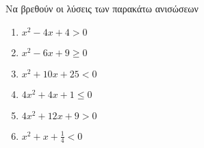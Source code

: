 Να βρεθούν οι λύσεις των παρακάτω ανισώσεων
\begin{multicols}{2}
\begin{enumerate}
\item $ x^2-4x+4>0 $
\item $ x^2-6x+9\geq 0 $
\item $ x^2+10x+25<0 $
\item $ 4x^2+4x+1\leq 0 $
\item $ 4x^2+12x+9>0 $
\item $ x^2+x+\frac{1}{4}<0 $
\end{enumerate}
\end{multicols}
